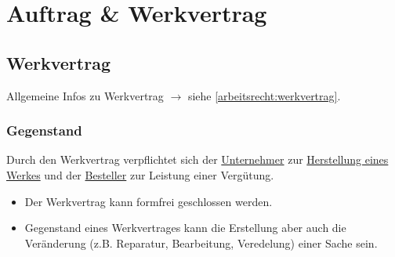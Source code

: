 \section{Auftrag \& Werkvertrag}

\subsection{Werkvertrag}
Allgemeine Infos zu Werkvertrag $\rightarrow$ siehe \ref{arbeitsrecht:werkvertrag}.

\subsubsection{Gegenstand}
Durch den Werkvertrag verpflichtet sich der \underline{Unternehmer} zur \underline{Herstellung eines Werkes} und der \underline{Besteller} zur Leistung einer Vergütung.

\begin{itemize}
    \item Der Werkvertrag kann formfrei geschlossen werden.
    \item Gegenstand eines Werkvertrages kann die Erstellung aber auch die Veränderung (z.B. Reparatur, Bearbeitung, Veredelung) einer Sache sein.
\end{itemize}

